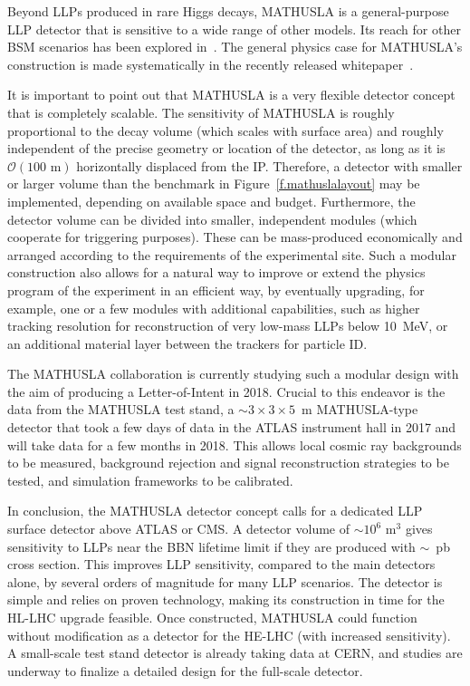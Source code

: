 Beyond LLPs produced in rare Higgs decays, MATHUSLA is a general-purpose LLP detector that is sensitive to a wide range of other models. Its reach for other BSM scenarios has been explored in~\cite{Co:2016fln, Dev:2016vle, Dev:2017dui, Caputo:2017pit, Evans:2017lvd, Evans:2017kti, Helo:2018qej, DAgnolo:2018wcn, Deppisch:2018eth, Jana:2018rdf}. The general physics case for MATHUSLA's construction is made systematically in the recently released whitepaper~\cite{Curtin:2018mvb}.

It is important to point out that MATHUSLA is a very flexible detector concept that is completely scalable.
%
The sensitivity of MATHUSLA is roughly proportional to the decay volume (which scales with surface area) and roughly independent of the precise geometry or location of the detector, as long as it is $\mathcal{O}(100 \,\,\mathrm{m})$ horizontally displaced from the IP.
%
Therefore, a detector with smaller or larger volume than the benchmark in Figure~\ref{f.mathuslalayout} may be implemented, depending on available space and budget.
%
Furthermore, the detector volume can be divided into smaller, independent modules (which cooperate for triggering purposes). These can be mass-produced economically and arranged according to the requirements of the experimental site.
%
Such a modular construction also allows for a natural way to improve or extend the physics program of the experiment in an efficient way, by eventually upgrading, for example, one or a few modules with additional capabilities, such as higher tracking resolution for reconstruction of very low-mass LLPs below 10~MeV, or an additional material layer between the trackers for particle ID.

The MATHUSLA collaboration is currently studying such a modular design with the aim of producing a Letter-of-Intent in 2018. Crucial to this endeavor is the data from the MATHUSLA test stand, a $\sim 3 \times 3 \times 5$~m MATHUSLA-type detector that took a few days of data in the ATLAS instrument hall in 2017 and will take data for a few months in 2018. This allows local cosmic ray backgrounds to be measured, background rejection and signal reconstruction strategies to be tested, and simulation frameworks to be calibrated.

In conclusion, the MATHUSLA detector concept calls for a dedicated LLP surface detector above ATLAS or CMS.
%
A detector volume of $\sim 10^6\,\,\mathrm{m}^3$ gives sensitivity to LLPs near the BBN lifetime limit if they are produced with $\sim$~pb cross section. This improves LLP sensitivity, compared to the main detectors alone, by several orders of magnitude for many LLP scenarios.
%
The detector is simple and relies on proven technology, making its construction in time for the HL-LHC upgrade feasible. Once constructed, MATHUSLA could function without modification as a detector for the HE-LHC (with increased sensitivity).
A small-scale test stand detector is already taking data at CERN, and studies are underway to finalize a detailed design for the full-scale detector.

